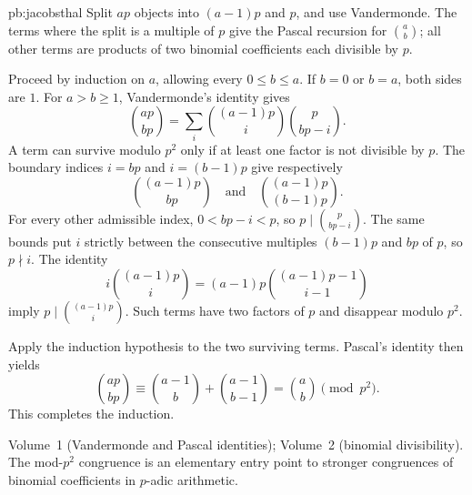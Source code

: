 \begin{solution}{pb:jacobsthal}
\idea Split $ap$ objects into $(a-1)p$ and $p$, and use Vandermonde. The terms where the split is a multiple of $p$ give the
Pascal recursion for $\binom ab$; all other terms are products of two binomial coefficients each divisible by $p$.

\writeup Proceed by induction on $a$, allowing every $0\le b\le a$. If $b=0$ or $b=a$, both sides are $1$. For $a>b\ge1$, Vandermonde's identity gives
\[
\binom{ap}{bp}
=\sum_i\binom{(a-1)p}{i}\binom p{bp-i}.
\]
A term can survive modulo $p^2$ only if at least one factor is not divisible by $p$. The boundary indices $i=bp$ and $i=(b-1)p$ give respectively
\[
\binom{(a-1)p}{bp}
\quad\text{and}\quad
\binom{(a-1)p}{(b-1)p}.
\]
For every other admissible index, $0<bp-i<p$, so $p\mid\binom p{bp-i}$. The same bounds put $i$ strictly between the consecutive multiples $(b-1)p$ and $bp$ of $p$, so $p\nmid i$. The identity
\[
i\binom{(a-1)p}{i}
=(a-1)p\binom{(a-1)p-1}{i-1}
\]
imply $p\mid\binom{(a-1)p}{i}$. Such terms have two factors of $p$ and disappear modulo $p^2$.

Apply the induction hypothesis to the two surviving terms. Pascal's identity then yields
\[
\binom{ap}{bp}
\equiv\binom{a-1}{b}+\binom{a-1}{b-1}
=\binom ab\pmod{p^2}.
\]
This completes the induction.

\tools Volume~1 (Vandermonde and Pascal identities); Volume~2 (binomial divisibility).
\leads The mod-$p^2$ congruence is an elementary entry point to stronger congruences of binomial coefficients in $p$-adic arithmetic.
\end{solution}

